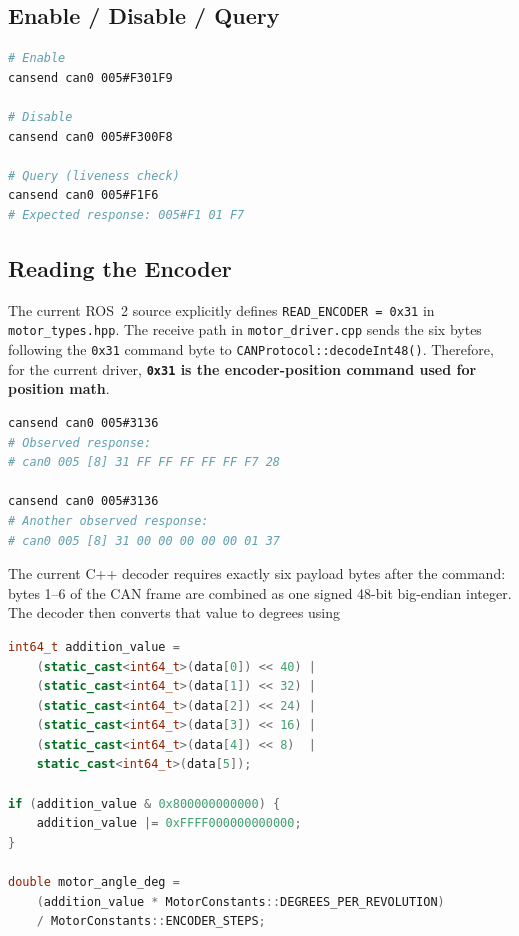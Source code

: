 \documentclass[11pt,letterpaper]{article}
\begin{document}
\subsection{Enable / Disable / Query}

\begin{lstlisting}[language=bash, caption={Enable, disable, and query -- all checksum-verified}]
# Enable
cansend can0 005#F301F9

# Disable
cansend can0 005#F300F8

# Query (liveness check)
cansend can0 005#F1F6
# Expected response: 005#F1 01 F7
\end{lstlisting}

\subsection{Reading the Encoder}
\label{sec:encoder}

The current ROS~2 source explicitly defines \texttt{READ\_ENCODER = 0x31} in
\texttt{motor\_types.hpp}.  The receive path in \texttt{motor\_driver.cpp} sends
the six bytes following the \texttt{0x31} command byte to
\texttt{CANProtocol::decodeInt48()}.  Therefore, for the current driver,
\textbf{\texttt{0x31} is the encoder-position command used for position math}.

\begin{lstlisting}[language=bash, caption={Observed Joint B encoder traffic}]
cansend can0 005#3136
# Observed response:
# can0 005 [8] 31 FF FF FF FF FF F7 28

cansend can0 005#3136
# Another observed response:
# can0 005 [8] 31 00 00 00 00 00 01 37
\end{lstlisting}

The current C++ decoder requires exactly six payload bytes after the command:
bytes 1--6 of the CAN frame are combined as one signed 48-bit big-endian
integer.  The decoder then converts that value to degrees using

\begin{lstlisting}[language=C++]
int64_t addition_value =
    (static_cast<int64_t>(data[0]) << 40) |
    (static_cast<int64_t>(data[1]) << 32) |
    (static_cast<int64_t>(data[2]) << 24) |
    (static_cast<int64_t>(data[3]) << 16) |
    (static_cast<int64_t>(data[4]) << 8)  |
    static_cast<int64_t>(data[5]);

if (addition_value & 0x800000000000) {
    addition_value |= 0xFFFF000000000000;
}

double motor_angle_deg =
    (addition_value * MotorConstants::DEGREES_PER_REVOLUTION)
    / MotorConstants::ENCODER_STEPS;
\end{lstlisting}
\end{document}
